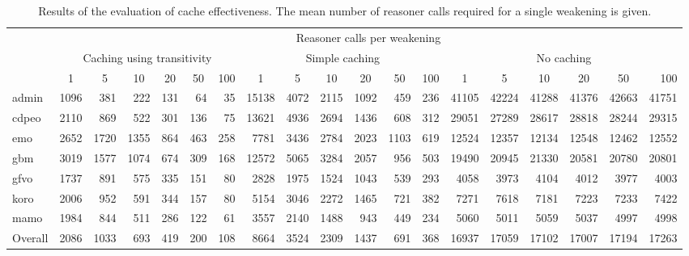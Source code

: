 \begin{table}[ht]
  \scriptsize
  \begin{widepage}[5cm]
    \centering
    \addtolength{\tabcolsep}{-1mm}
    \begin{tabular}{|l|rrrrrr|rrrrrr|rrrrrr|}
      \cline{2-19}
      \multicolumn{1}{l|}{} & \multicolumn{18}{c|}{\hspace{-9mm}Reasoner calls per weakening} \\
      \multicolumn{1}{l|}{} & \multicolumn{6}{c}{Caching using transitivity} & \multicolumn{6}{c}{Simple caching} & \multicolumn{6}{c|}{No caching} \\
      \multicolumn{1}{l|}{} & \multicolumn{1}{c}{1} & \multicolumn{1}{c}{5} & \multicolumn{1}{c}{10} & \multicolumn{1}{c}{20} & \multicolumn{1}{c}{50} & \multicolumn{1}{c}{100} & \multicolumn{1}{c}{1} & \multicolumn{1}{c}{5} & \multicolumn{1}{c}{10} & \multicolumn{1}{c}{20} & \multicolumn{1}{c}{50} & \multicolumn{1}{c}{100} & \multicolumn{1}{c}{1} & \multicolumn{1}{c}{5} & \multicolumn{1}{c}{10} & \multicolumn{1}{c}{20} & \multicolumn{1}{c}{50} & 100 \\
      \hline
      admin & 1096 & 381 & 222 & 131 & 64 & 35
        & 15138 & 4072 & 2115 & 1092 & 459 & 236
        & 41105 & 42224 & 41288 & 41376 & 42663 & 41751 \\
      cdpeo & 2110 & 869 & 522 & 301 & 136 & 75
        & 13621 & 4936 & 2694 & 1436 & 608 & 312
        & 29051 & 27289 & 28617 & 28818 & 28244 & 29315 \\
      emo & 2652 & 1720 & 1355 & 864 & 463 & 258
        & 7781 & 3436 & 2784 & 2023 & 1103 & 619
        & 12524 & 12357 & 12134 & 12548 & 12462 & 12552 \\
      gbm & 3019 & 1577 & 1074 & 674 & 309 & 168
        & 12572 & 5065 & 3284 & 2057 & 956 & 503
        & 19490 & 20945 & 21330 & 20581 & 20780 & 20801 \\
      gfvo &  1737 & 891 & 575 & 335 & 151 & 80
        & 2828 & 1975 & 1524 & 1043 & 539 & 293
        & 4058 & 3973 & 4104 & 4012 & 3977 & 4003 \\
      koro & 2006 & 952 & 591 & 344 & 157 & 80
        & 5154 & 3046 & 2272 & 1465 & 721 & 382
        & 7271 & 7618 & 7181 & 7223 & 7233 & 7422 \\
      mamo &  1984 & 844 & 511 & 286 & 122 & 61
        & 3557 & 2140 & 1488 & 943 & 449 & 234
        & 5060 & 5011 & 5059 & 5037 & 4997 & 4998 \\
      \hline
      Overall & 2086 & 1033 & 693 & 419 & 200 & 108
        & 8664 & 3524 & 2309 & 1437 & 691 & 368
        & 16937 & 17059 & 17102 & 17007 & 17194 & 17263 \\
      \hline
    \end{tabular}
  \end{widepage}
  \caption{Results of the evaluation of cache effectiveness. The mean number of reasoner calls required for a single weakening is given.}
\end{table}

